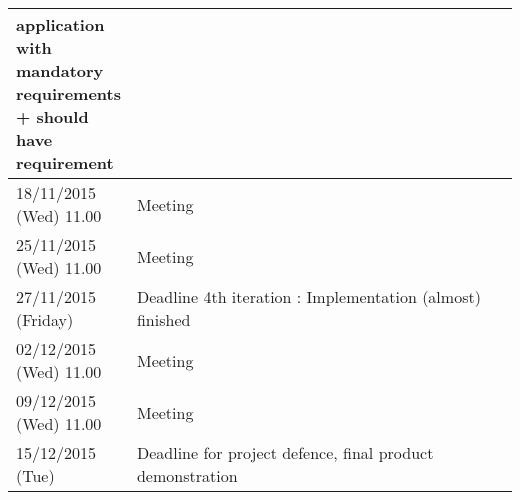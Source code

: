 \begin{longtable}{|p{0.2\linewidth}|p{0.8\linewidth}|}
    application with mandatory requirements + should have requirement\\
    \hline
    18/11/2015 (Wed) 11.00 & Meeting \\
    \hline
    25/11/2015 (Wed) 11.00 & Meeting \\
    \hline
    27/11/2015 (Friday) & Deadline 4th iteration : Implementation (almost)
    finished \\
    \hline
    02/12/2015 (Wed) 11.00 & Meeting \\
    \hline
    09/12/2015 (Wed) 11.00 & Meeting \\
    \hline
    15/12/2015 (Tue) & Deadline for project defence, final product
    demonstration \\
    \hline
\end{longtable}

